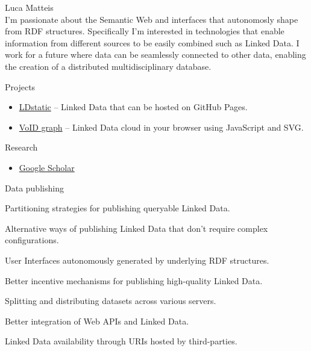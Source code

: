 \documentclass[12pt]{extarticle}
\newcommand{\cmr}{\fontencoding{T1}\fontfamily{cmr}\selectfont} %
\begin{document}
{\fontsize{20}{20} \sc \noindent Luca Matteis}\\

{\cmr \noindent I'm passionate about the Semantic Web and interfaces that autonomosly shape from RDF structures. Specifically I'm interested in technologies that enable information from different sources to be easily combined such as Linked Data. I work for a future where data can be seamlessly connected to other data, enabling the creation of a distributed multidisciplinary database.}

\vspace{10 mm}

{\fontsize{15}{15} \sc \noindent Projects}

{\cmr
\begin{itemize}
  \item[] \href{http://lmatteis.github.io/ldstatic/}{LDstatic} -- Linked Data that can be hosted on GitHub Pages.
  \item[] \href{http://lmatteis.github.io/void-graph/}{VoID graph} -- Linked Data cloud in your browser using JavaScript and SVG.
\end{itemize}
}

\vspace{5 mm}

{\fontsize{15}{15} \sc \noindent Research}

{\cmr
\begin{itemize}
  \item[] \href{http://scholar.google.com/citations?user=4shOPsgAAAAJ}{Google Scholar}  
\end{itemize}
}
\vspace{5 mm}

{\fontsize{10}{10} \sc \noindent Data publishing}\\

{\cmr
Partitioning strategies for publishing queryable Linked Data.

Alternative ways of publishing Linked Data that don't require complex configurations.

User Interfaces autonomously generated by underlying RDF structures.

Better incentive mechanisms for publishing high-quality Linked Data.

Splitting and distributing datasets across various servers.

Better integration of Web APIs and Linked Data.

Linked Data availability through URIs hosted by third-parties.

}
\end{document}

